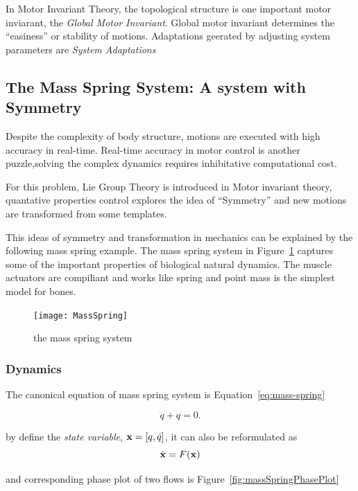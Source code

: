 In Motor Invariant Theory, the topological structure is one important motor inviarant, the \emph{Global Motor Invariant}.
Global motor invariant determines the ``easiness'' or stability of motions.
Adaptations geerated by adjusting system parameters are \emph{System Adaptations}


\subsection{The Mass Spring System: A system with Symmetry}
Despite the complexity of body structure, motions are executed with high accuracy in real-time.
Real-time accuracy in motor control is another puzzle,solving the complex dynamics requires inhibitative computational cost.

For this problem, Lie Group Theory is introduced in Motor invariant theory, 
quantative properties control explores the idea of ``Symmetry'' and new motions are transformed from some templates.

This ideas of symmetry and transformation in mechanics can be explained by the following mass spring example.
The mass spring system in Figure~\ref{fig:massspring} captures some of the important properties of biological natural dynamics.
The muscle actuators are compiliant and works like spring and point mass is the simplest model for bones.

\begin{figure}[!htbp]
  \begin{center}
    \texttt{[image: MassSpring]}
    \caption{the mass spring system}
    \label{fig:massspring}
  \end{center}
\end{figure}

\subsubsection*{Dynamics}




The canonical equation of mass spring system is Equation~\ref{eq:mass-spring}

\begin{equation}
\label{eq:mass-spring}
\ddot{q}+q=0.
\end{equation}

by define the \emph{state variable}, $\mathbf{x}=[q,\dot{q}]$, it can also be reformulated as
\[
\dot{\mathbf{x}}=F(\mathbf{x})
\]

and corresponding phase plot of two flows is Figure~\ref{fig:massSpringPhasePlot}


